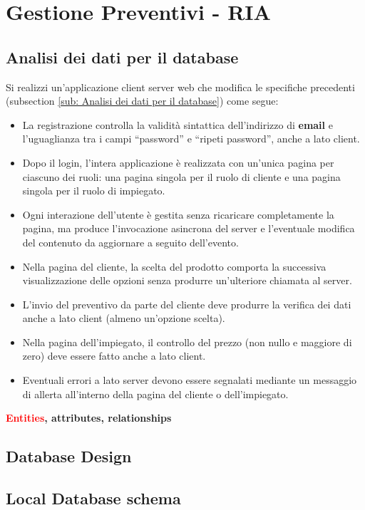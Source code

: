 \documentclass[a4paper, 12pt]{article}
\begin{document}
\newpage
\section{Gestione Preventivi - RIA}
\subsection{Analisi dei dati per il database}
Si realizzi un’applicazione client server web che modifica le specifiche precedenti (subsection \ref{sub: Analisi dei dati per il database}) come segue:
\begin{itemize}
\item La registrazione controlla la validità sintattica dell’indirizzo di \textbf{\textcolor{myGreen}{email}} e l’uguaglianza tra i campi “password” e “ripeti password”, anche a lato client.
\item Dopo il login, l’intera applicazione è realizzata con un’unica pagina per ciascuno dei ruoli: una pagina singola per il ruolo di cliente e una pagina singola per il ruolo di impiegato.
\item Ogni interazione dell’utente è gestita senza ricaricare completamente la pagina, ma produce l’invocazione asincrona del server e l’eventuale modifica del contenuto da aggiornare a seguito dell’evento.
\item Nella pagina del cliente, la scelta del prodotto comporta la successiva visualizzazione delle opzioni senza produrre un’ulteriore chiamata al server.
\item L’invio del preventivo da parte del cliente deve produrre la verifica dei dati anche a lato client (almeno un’opzione scelta).
\item Nella pagina dell’impiegato, il controllo del prezzo (non nullo e maggiore di zero) deve essere fatto anche a lato client.
\item Eventuali errori a lato server devono essere segnalati mediante un messaggio di allerta all’interno della pagina del cliente o dell’impiegato.\\
\end{itemize}
\noindent \textbf{\textcolor{red}{Entities}, \textcolor{myGreen}{attributes}, \textcolor{myBlue}{relationships}}
\subsection{Database Design}
\subsection{Local Database schema}
\end{document}
